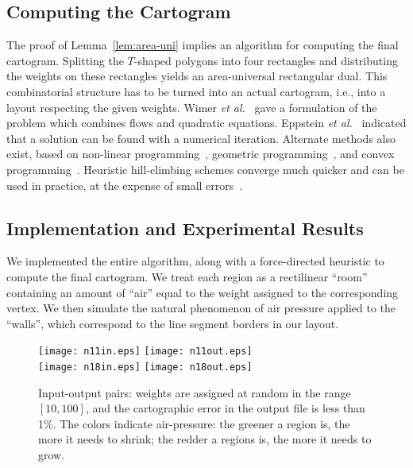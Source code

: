 \documentclass[11pt]{article}
\begin{document}
\subsection{Computing the Cartogram}

The proof of Lemma~\ref{lem:area-uni} implies an algorithm for computing the final cartogram. Splitting the $T$-shaped polygons
 into four rectangles and distributing the weights on these rectangles yields an
area-universal rectangular dual.  This combinatorial structure has to be
turned into an actual cartogram, i.e., into a layout respecting the given
weights.
Wimer \textit{et al.}~\cite{WKC} gave a formulation of the problem
which combines flows and quadratic equations.  Eppstein \textit{et al.}~\cite{EMVS} indicated that a solution can be
 found with a numerical iteration.  Alternate methods also exist, based on non-linear programming~\cite{rosenberg},
 geometric programming~\cite{MCH96}, and convex programming~\cite{ChenFan98}. Heuristic hill-climbing schemes converge
 much quicker and can be used in practice, at the expense of small errors~\cite{Ceder92,ITK98,WC95}.


\subsection{Implementation and Experimental Results}

We implemented the entire algorithm, along with a force-directed heuristic to compute the final cartogram.
We treat each region as a rectilinear ``room'' containing an amount of ``air'' equal to the weight assigned to the corresponding vertex. We then simulate the natural phenomenon
 of air pressure applied to the ``walls'', which correspond to the line segment borders in our layout.

\begin{figure}[htbp]
\centering
\texttt{[image: n11in.eps]}\hspace{.4cm}
\texttt{[image: n11out.eps]}\\
\vspace{.5cm}
\texttt{[image: n18in.eps]}\hspace{.4cm}
\texttt{[image: n18out.eps]}
\caption{\small\sf Input-output pairs: weights are assigned at random in the range $[10,100]$, and the cartographic error in the output file is less than 1\%. The colors indicate air-pressure: the greener a region is, the more it needs to shrink; the redder a regions is, the more it needs to grow.}
\label{fig:examples}
\end{figure}
\end{document}
